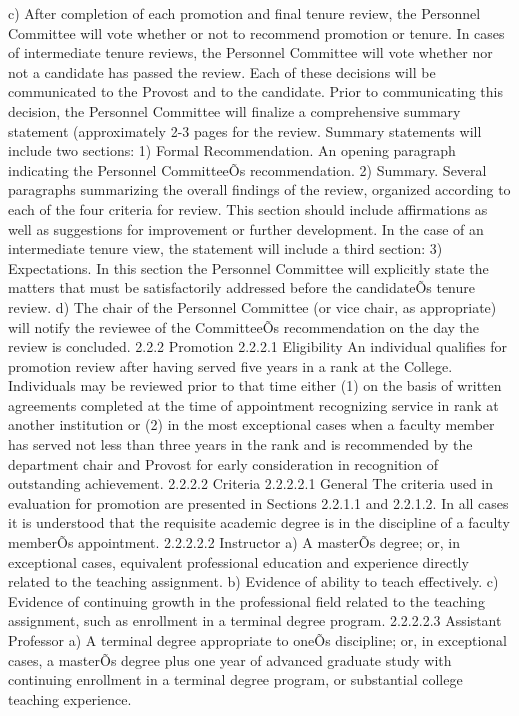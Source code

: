 \documentclass[letterpaper, 11pt]{article}
\begin{document}
	c) After completion of each promotion and final tenure review, the Personnel Committee will vote whether or not to recommend promotion or tenure.  In cases of intermediate tenure reviews, the Personnel Committee will vote whether nor not a candidate has passed the review.  Each of these decisions will be communicated to the Provost and to the candidate.  Prior to communicating this decision, the Personnel Committee will finalize a comprehensive summary statement (approximately 2-3 pages for the review.  Summary statements will include two sections:
	1) Formal Recommendation.  An opening paragraph indicating the Personnel CommitteeÕs recommendation.
	2) Summary.  Several paragraphs summarizing the overall findings of the review, organized according to each of the four criteria for review.  This section should include affirmations as well as suggestions for improvement or further development.
	In the case of an intermediate tenure view, the statement will include a third section:
	3) Expectations.  In this section the Personnel Committee will explicitly state the matters that must be satisfactorily addressed before the candidateÕs tenure review.
	d)   The chair of the Personnel Committee (or vice chair, as appropriate) will notify the reviewee of the CommitteeÕs recommendation on the day the review is concluded.
	2.2.2 Promotion
	2.2.2.1 Eligibility
	An individual qualifies for promotion review after having served five years in a rank at the College.  Individuals may be reviewed prior to that time either (1) on the basis of written agreements completed at the time of appointment recognizing service in rank at another institution or (2) in the most exceptional cases when a faculty member has served not less than three years in the rank and is recommended by the department chair and Provost for early consideration in recognition of outstanding achievement.
	2.2.2.2 Criteria
	2.2.2.2.1 General
	The criteria used in evaluation for promotion are presented in Sections 2.2.1.1 and 2.2.1.2. In all cases it is understood that the requisite academic degree is in the discipline of a faculty memberÕs appointment.
	2.2.2.2.2 Instructor
	a) A masterÕs degree; or, in exceptional cases, equivalent professional education and experience directly related to the teaching assignment.
	b) Evidence of ability to teach effectively.
	c) Evidence of continuing growth in the professional field related to the teaching assignment, such as enrollment in a terminal degree program.
	2.2.2.2.3 Assistant Professor
	a) A terminal degree appropriate to oneÕs discipline; or, in exceptional cases, a masterÕs degree plus one year of advanced graduate study with continuing enrollment in a terminal degree program, or substantial college teaching experience.
\end{document}
